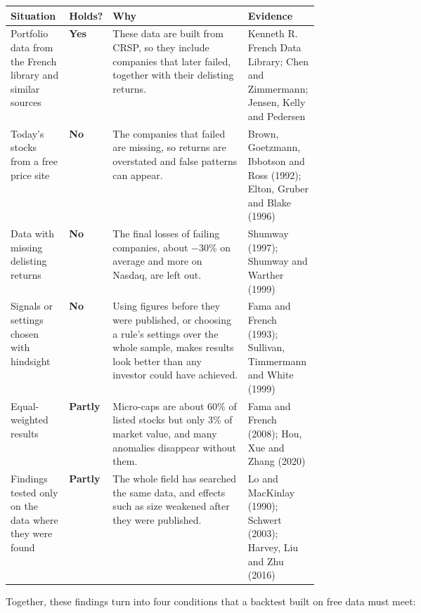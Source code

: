 \begin{center}
\small
\begin{tabularx}{\linewidth}{@{}>{\raggedright\arraybackslash}p{0.19\linewidth}>{\raggedright\arraybackslash}p{0.09\linewidth}>{\raggedright\arraybackslash}X>{\raggedright\arraybackslash}p{0.23\linewidth}@{}}
\toprule
Situation & Holds? & Why & Evidence \\
\midrule
Portfolio data from the French library and similar sources & \textbf{Yes} & These data are built from CRSP, so they include companies that later failed, together with their delisting returns. & Kenneth R. French Data Library; Chen and Zimmermann; Jensen, Kelly and Pedersen \\
\addlinespace[3pt]
Today's stocks from a free price site & \textbf{No} & The companies that failed are missing, so returns are overstated and false patterns can appear. & Brown, Goetzmann, Ibbotson and Ross (1992); Elton, Gruber and Blake (1996) \\
\addlinespace[3pt]
Data with missing delisting returns & \textbf{No} & The final losses of failing companies, about $-30$\% on average and more on Nasdaq, are left out. & Shumway (1997); Shumway and Warther (1999) \\
\addlinespace[3pt]
Signals or settings chosen with hindsight & \textbf{No} & Using figures before they were published, or choosing a rule's settings over the whole sample, makes results look better than any investor could have achieved. & Fama and French (1993); Sullivan, Timmermann and White (1999) \\
\addlinespace[3pt]
Equal-weighted results & \textbf{Partly} & Micro-caps are about 60\% of listed stocks but only 3\% of market value, and many anomalies disappear without them. & Fama and French (2008); Hou, Xue and Zhang (2020) \\
\addlinespace[3pt]
Findings tested only on the data where they were found & \textbf{Partly} & The whole field has searched the same data, and effects such as size weakened after they were published. & Lo and MacKinlay (1990); Schwert (2003); Harvey, Liu and Zhu (2016) \\
\bottomrule
\end{tabularx}
\end{center}

Together, these findings turn into four conditions that a backtest built on free data must meet:

